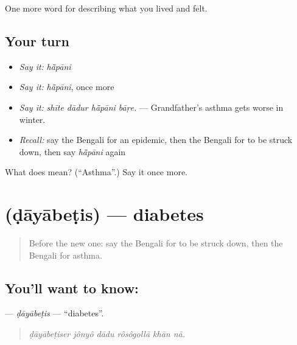 \begin{grammarlens}[title={What you've built}]
One more word for describing what you lived and felt.
\end{grammarlens}

\subsection*{Your turn}
\begin{itemize}
\raggedright
  \item \emph{Say it:} \emph{hā̃pāni}
  \item \emph{Say it:} \emph{hā̃pāni}, once more
  \item \emph{Say it:} \emph{shīte dādur hā̃pāni bāṛe.} — Grandfather's asthma gets worse in winter.
  \item \emph{Recall:} say the Bengali for an epidemic, then the Bengali for to be struck down, then say \emph{hā̃pāni} again
\end{itemize}

\begin{tcolorbox}[breakable,colback=teal!4,colframe=teal!35!black,title={Before you move on}]
What does  mean? (\textquotedblleft{}Asthma\textquotedblright{}.) Say it once more.
\end{tcolorbox}
\section[\texorpdfstring{\bn{ডায়াবেটিস} (ḍāyābeṭis)}{ডায়াবেটিস (ḍāyābeṭis)}]{ (ḍāyābeṭis) — diabetes}

\label{lesson:BN-C474-dayabetis}



\begin{quote}
Before the new one: say the Bengali for to be struck down, then the Bengali for asthma.
\end{quote}

\subsection*{You'll want to know: }
\textbf{} — \emph{ḍāyābeṭis} — \textquotedblleft{}diabetes\textquotedblright{}.

\begin{quote}
     
\end{quote}

\begin{quote}
\emph{ḍāyābeṭiser jônyô dādu rôsôgollā khān nā.}
\end{quote}

